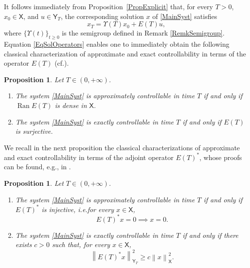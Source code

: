 \documentclass[10pt]{amsart}
\providecommand{\eg}{}
\renewcommand{\eg}{e.g.,\xspace}
\theoremstyle{plain}
\newtheorem{prop}[theo]{Proposition}
\theoremstyle{definition}
\DeclareMathOperator{\range}{Ran}
\newcommand{\norm}[1]{\left\lVert #1\right\lVert}
\providecommand{\ie}{i.e.}\providecommand{\etc}{etc.}\providecommand{\resp}{resp.}\providecommand{\cf}{cf.}
\begin{document}
It follows immediately from Proposition~\ref{PropExplicit} that, for every $T > 0$, $x_0 \in \mathsf X$, and $u \in \mathsf Y_T$, the corresponding solution $x$ of \eqref{MainSyst} satisfies\vspace*{-3pt}
\begin{equation}
\label{EqSolOperators}
x_T = \Upsilon(T) x_0 + E(T) u,
\end{equation}
where $\{\Upsilon(t)\}_{t \geq 0}$ is the semigroup defined in Remark \ref{RemkSemigroup}. Equation \eqref{EqSolOperators} enables one to immediately obtain the following classical characterization of approximate and exact controllability in terms of the operator $E(T)$ (\cf \cite[Lem.\,2.46]{Coron2007Control}).

\begin{prop}
\label{PropETControl}
Let $T \in (0, +\infty)$.
\begin{enumerate}
\item\label{PropETControlApprox} The system \eqref{MainSyst} is approximately controllable in time $T$ if and only if $\range E(T)$ is dense in $\mathsf X$.
\item\label{PropETControlExact} The system \eqref{MainSyst} is exactly controllable in time $T$ if and only if $E(T)$ is surjective.
\end{enumerate}
\end{prop}

We recall in the next proposition the classical characterizations of approximate and exact controllability in terms of the adjoint operator $E(T)^\ast$, whose proofs can be found, \eg in \cite[\S 2.3.2]{Coron2007Control}.

\begin{prop}
\label{PropControl}
Let $T \in (0, +\infty)$.
\begin{enumerate}
\item The system \eqref{MainSyst} is approximately controllable in time $T$ if and only if $E(T)^\ast$ is injective, \ie for every $x \in \mathsf X$,
\begin{equation}
\label{UniqueContinuation}
E(T)^\ast x = 0 \implies x = 0.
\end{equation}

\item\label{ControlExactETAst} The system \eqref{MainSyst} is exactly controllable in time $T$ if and only if there exists $c > 0$ such that, for every $x \in \mathsf X$,
\begin{equation}
\label{ObservabilityInequality}
\norm{E(T)^\ast x}_{\mathsf Y_T}^2 \geq c \norm{x}_{\mathsf X}^2.
\end{equation}
\end{enumerate}
\end{prop}
\end{document}
